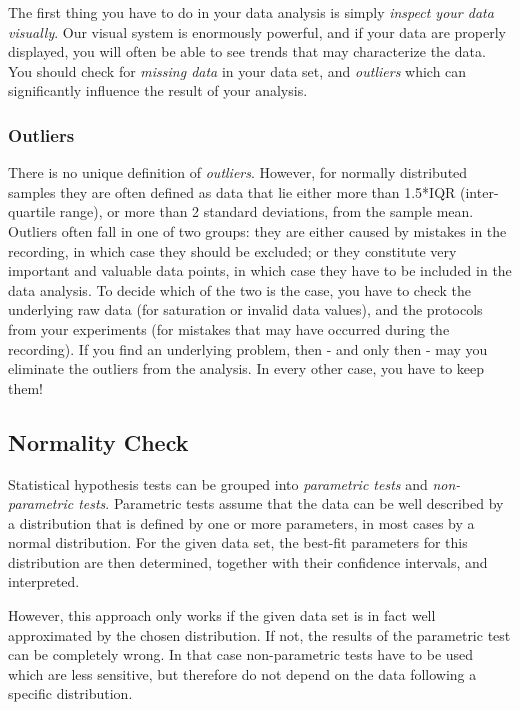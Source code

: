 The first thing you have to do in your data analysis is simply \emph{inspect your data visually}. Our visual system is enormously powerful, and if your data are properly displayed, you will often be able to see trends that may characterize the data. You should check for \emph{missing data} in your data set, and \emph{outliers} which can significantly influence the result of your analysis.

\subsubsection{Outliers} 

There is no unique definition of \emph{outliers}. However, for normally distributed samples they are often defined as data that lie either more than 1.5*IQR (inter-quartile range), or more than 2 standard deviations, from the sample mean. Outliers often fall in one of two groups: they are either caused by mistakes in the recording, in which case they should be excluded; or they constitute very important and valuable data points, in which case they have to be included in the data analysis. To decide which of the two is the case, you have to check the underlying raw data (for saturation or invalid data values), and the protocols from your experiments (for mistakes that may have occurred during the recording). If you find an underlying problem, then - and only then - may you eliminate the outliers from the analysis. In every other case, you have to keep them!

\subsection{Normality Check} 

Statistical hypothesis tests can be grouped into \emph{parametric tests}  and \emph{non-parametric tests}. Parametric tests assume that the data can be well described by a distribution that is defined by one or more parameters, in most cases by a normal distribution. For the given data set, the best-fit parameters for this distribution are then determined, together with their confidence intervals, and interpreted.

However, this approach only works if the given data set is in fact well approximated by the chosen distribution. If not, the results of the parametric test can be completely wrong. In that case non-parametric tests have to be used which are less sensitive, but therefore do not depend on the data following a specific distribution.

